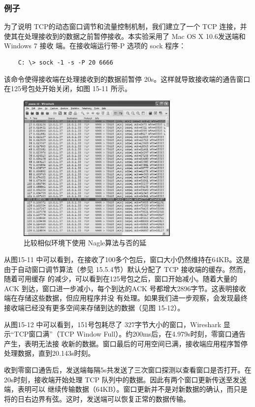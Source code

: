 \subsubsection{例子}

为了说明 TCP的动态窗口调节和流量控制机制，我们建立了一个 TCP 连接，并使其在处理接收到的数据之前暂停接收。本实验采用了 Mac OS X 10.6发送端和 Windows 7 接收
端。在接收端运行带-P 选项的 sock 程序：
\begin{verbatim}
    C: \> sock -1 -s -P 20 6666
\end{verbatim}
该命令使得接收端在处理接收到的数据前暂停 20s。这样就导致接收端的通告窗口在125号包处开始关闭，如图 15-11 所示。
\begin{figure}[!htb]
    \centering
	\includegraphics[width=0.7\textwidth]{imgs/15/15-11.png}
	\caption{比较相似环境下使用 Nagle算法与否的延}
\end{figure}
从图15-11 中可以看到，在接收了100多个包后，窗口大小仍然维持在64KB。这是由于自动窗口调节算法（参见 15.5.4节）默认分配了 TCP 接收端的缓存。然而，随着可用缓存
的减少，可以看到在125号包之后，窗口开始减小。随着大量的ACK 到达，窗口进一步减小，每个到达的ACK 号都增大2896字节。这表明接收端在存储这些数据，但应用程序并没
有处理。如果我们进一步观察，会发现最终接收端已经没有更多空间来存储到达的数据（见图 15-12）。

从图15-12 中可以看到，151号包耗尽了 327字节大小的窗口，Wireshark 显示“TCP窗口满”（TCP Window Full）。约200ms后，在4.979s时刻，零窗口通告产生，表明无法接
收新的数据。窗口最后的可用空间已满，接收端应用程序暂停处理数据，直到20.143s时刻。

收到零窗口通告后，发送端每隔5s共发送了三次窗口探测以查看窗口是否打开。在20s时刻，接收端开始处理 TCP 队列中的数据。因此有两个窗口更新传送至发送端，表明可以
继续传输数据（64KB）。窗口更新并不是对新数据的确认，而只是将的日右边界有弦。这时，发送端可以恢复正常的数据传输。

